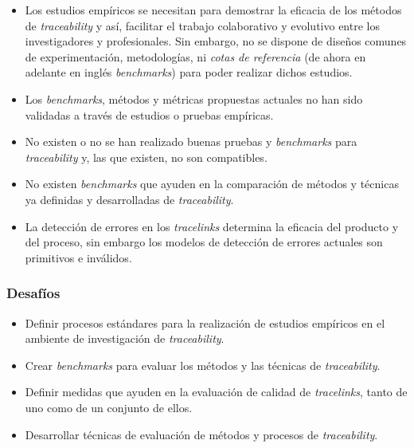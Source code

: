 \documentclass[a4paper,12pt,oneside,spanish]{book}
\begin{document}
\begin{itemize}[label={$\times$}]

\item Los estudios empíricos se necesitan para demostrar la eficacia de los métodos de \textit{traceability} y así, facilitar el trabajo colaborativo y evolutivo entre los investigadores y profesionales. Sin embargo, no se dispone de diseños comunes de experimentación, metodologías, ni \textit{cotas de referencia} (de ahora en adelante en inglés \textit{benchmarks}) para poder realizar dichos estudios.

\item Los \textit{benchmarks}, métodos y métricas propuestas actuales no han sido validadas a través de estudios o pruebas empíricas.

\item No existen o no se han realizado buenas pruebas y \textit{benchmarks} para \textit{traceability} y, las que existen, no son compatibles. 

\item No existen \textit{benchmarks} que ayuden en la comparación de métodos y técnicas ya definidas y desarrolladas de \textit{traceability}.

\item La detección de errores en los \textit{tracelinks} determina la eficacia del producto y del proceso, sin embargo los modelos de detección de errores actuales son primitivos e inválidos.

\end{itemize}

\subsubsection{Desafíos}

\begin{itemize}[label={\checkmark}]

\item Definir procesos estándares para la realización de estudios empíricos en el ambiente de investigación de \textit{traceability}.

\item Crear \textit{benchmarks} para evaluar los métodos y las técnicas de \textit{traceability}.

\item Definir medidas que ayuden en la evaluación de calidad de \textit{tracelinks}, tanto de uno como de un conjunto de ellos.

\item Desarrollar técnicas de evaluación de métodos y procesos de \textit{traceability}.

\end{itemize}
\end{document}
